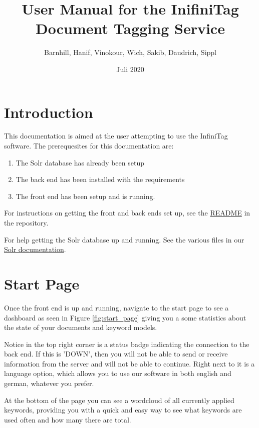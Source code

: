 \documentclass{article}
\title{User Manual for the InifiniTag Document Tagging Service}
\author{Barnhill, Hanif, Vinokour, Wich, Sakib, Daudrich, Sippl}
\date{Juli 2020}
\begin{document}
\maketitle
\tableofcontents

\newpage

\section{Introduction}
This documentation is aimed at the user attempting to use the InfiniTag software. The prerequesites
for this documentation are:

\begin{enumerate}
    \item The Solr database has already been setup
    \item The back end has been installed with the requirements
    \item The front end has been setup and is running.
\end{enumerate}

\bigskip
\noindent
For instructions on getting the front and back ends set up, see the \href{https://github.com/AMOS-5/infinitag/blob/master/README.md}{README} in the repository.

\bigskip
\noindent
For help getting the Solr database up and running. See the various files in our \href{https://github.com/AMOS-5/infinitag/tree/master/docs/solr}{Solr documentation}.



\section{Start Page}
\label{startpage}

Once the front end is up and running, navigate to the start page to see a dashboard as seen in Figure \ref{fig:start_page} giving you a some statistics about the state of your documents and keyword models.

Notice in the top right corner is a status badge indicating the connection to the back end. If this is 'DOWN', then you will not be able to send or receive information from the server and will not be able to continue.
Right next to it is a language option, which allows you to use our software in both english and german, whatever you prefer.

At the bottom of the page you can see a wordcloud of all currently applied keywords, providing you with a quick and easy way to see what keywords are used often and how many there are total.
\end{document}
